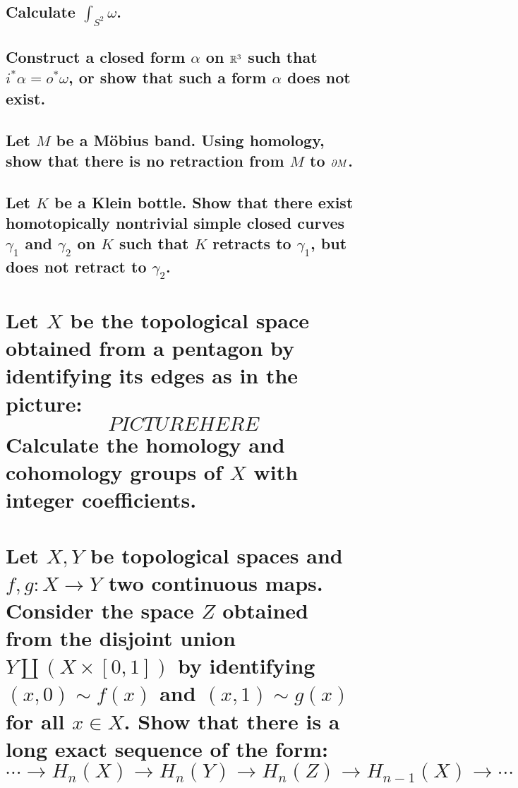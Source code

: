 \documentclass[10pt]{article}
\begin{document}
\subsection{Calculate $\int_{S^2} \omega$.}

\subsection{Construct a closed form $\alpha$ on $\mathbb{R}^3$ such that $i^*\alpha = o^*\omega$, or
  show that such a form $\alpha$ does not exist.}

\advsection{}

\subsection{Let $M$ be a M\"obius band. Using homology, show that there is no retraction from $M$ to
$\partial M$.}

\subsection{Let $K$ be a Klein bottle. Show that there exist homotopically nontrivial simple closed
  curves $\gamma_1$ and $\gamma_2$ on $K$ such that $K$ retracts to $\gamma_1$, but does not retract
  to $\gamma_2$. }

\section{Let $X$ be the topological space obtained from a pentagon by identifying its edges as in
  the picture:
  $$PICTURE HERE$$
  Calculate the homology and cohomology groups of $X$ with integer coefficients.}

\section{Let $X,Y$ be topological spaces and $f,g : X \to Y$ two continuous maps. Consider the space
  $Z$ obtained from the disjoint union $Y \amalg ( X \times [0,1])$ by identifying $(x,0) \sim
  f(x)$ and $(x,1) \sim g(x)$ for all $x \in X$. Show that there is a long exact sequence of the
  form:
  $$ \cdots \to H_n(X) \to H_n(Y) \to H_n(Z) \to H_{n-1}(X) \to \cdots$$}
\end{document}
